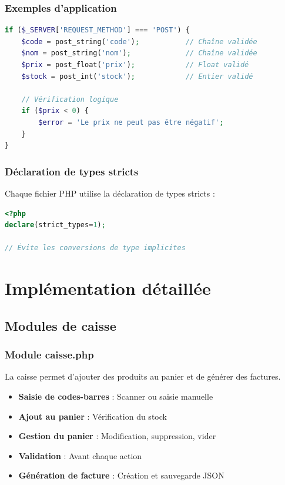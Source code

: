 \documentclass[12pt,a4paper,french]{report}
\begin{document}
\subsection{Exemples d'application}

\begin{lstlisting}[language=PHP, caption=Validation lors de l'ajout de produit]
if ($_SERVER['REQUEST_METHOD'] === 'POST') {
    $code = post_string('code');           // Chaîne validée
    $nom = post_string('nom');             // Chaîne validée
    $prix = post_float('prix');            // Float validé
    $stock = post_int('stock');            // Entier validé
    
    // Vérification logique
    if ($prix < 0) {
        $error = 'Le prix ne peut pas être négatif';
    }
}
\end{lstlisting}

\subsection{Déclaration de types stricts}

Chaque fichier PHP utilise la déclaration de types stricts :

\begin{lstlisting}[language=PHP]
<?php
declare(strict_types=1);

// Évite les conversions de type implicites
\end{lstlisting}

\chapter{Implémentation détaillée}

\section{Modules de caisse}

\subsection{Module caisse.php}

La caisse permet d'ajouter des produits au panier et de générer des factures.

\begin{itemize}
    \item \textbf{Saisie de codes-barres} : Scanner ou saisie manuelle
    \item \textbf{Ajout au panier} : Vérification du stock
    \item \textbf{Gestion du panier} : Modification, suppression, vider
    \item \textbf{Validation} : Avant chaque action
    \item \textbf{Génération de facture} : Création et sauvegarde JSON
\end{itemize}
\end{document}

